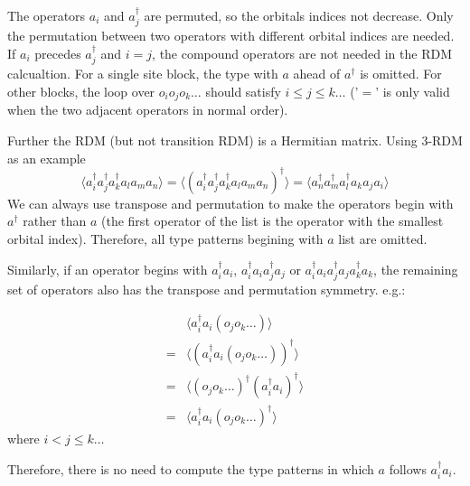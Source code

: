 The operators $a_i$ and $a^\dagger_j$ are permuted, so the orbitals indices not decrease. Only the permutation between two operators with different orbital indices are needed.
If $a_i$ precedes $a^\dagger_j$ and $i=j$, the compound operators are not needed in the RDM calcualtion. For a single site block, the type with $a$ ahead of $a^\dagger$ is omitted. For other blocks, the loop over $o_io_jo_k\dots$ should satisfy $i \le j \le k\dots$ ('$=$' is only valid when the two adjacent operators in normal order). 


Further the RDM (but not transition RDM) is a Hermitian matrix. Using 3-RDM as an example 
\begin{equation}
  \langle a_i^\dagger a_j^\dagger a^\dagger_k a_l a_m a_n\rangle = \langle(a_i^\dagger a_j^\dagger a^\dagger_k a_l a_m a_n)^\dagger\rangle
  = \langle a_n^\dagger a_m^\dagger a_l^\dagger a_k a_j a_i\rangle
\end{equation}
We can always use transpose and permutation to make the operators begin with $a^\dagger$ rather than $a$ (the first operator of the list is the operator with the smallest orbital index). Therefore, all type patterns begining with $a$ list are omitted. 

Similarly, if an operator begins with $a^\dagger_ia_i$, $a^\dagger_ia_ia^\dagger_ja_j$ or $a^\dagger_ia_ia^\dagger_ja_ja^\dagger_ka_k$, the remaining set of operators also has the transpose and permutation symmetry. e.g.:

\begin{equation}
\begin{aligned}
  &\langle a^\dagger_ia_i(o_j o_k\dots)\rangle \\
  = &\langle(a^\dagger_ia_i (o_j o_k\dots))^\dagger\rangle \\
  = &\langle(o_j o_k\dots)^\dagger(a^\dagger_ia_i)^\dagger\rangle \\
  = &\langle a^\dagger_ia_i(o_j o_k\dots)^\dagger\rangle
\end{aligned}
\end{equation}
where $i < j\le k\dots$

Therefore, there is no need to compute the type patterns in which $a$ follows $a^\dagger_ia_i$.

